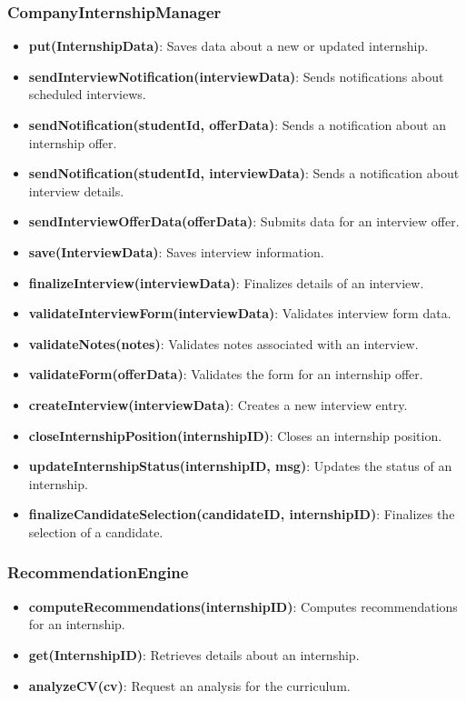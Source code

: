 \subsubsection{CompanyInternshipManager}
\begin{itemize}
    \item \textbf{put(InternshipData)}: Saves data about a new or updated internship.
    \item \textbf{sendInterviewNotification(interviewData)}: Sends notifications about scheduled interviews.
    \item \textbf{sendNotification(studentId, offerData)}: Sends a notification about an internship offer.
    \item \textbf{sendNotification(studentId, interviewData)}: Sends a notification about interview details.
    \item \textbf{sendInterviewOfferData(offerData)}: Submits data for an interview offer.
    \item \textbf{save(InterviewData)}: Saves interview information.
    \item \textbf{finalizeInterview(interviewData)}: Finalizes details of an interview.
    \item \textbf{validateInterviewForm(interviewData)}: Validates interview form data.
    \item \textbf{validateNotes(notes)}: Validates notes associated with an interview.
    \item \textbf{validateForm(offerData)}: Validates the form for an internship offer.
    \item \textbf{createInterview(interviewData)}: Creates a new interview entry.
    \item \textbf{closeInternshipPosition(internshipID)}: Closes an internship position.
    \item \textbf{updateInternshipStatus(internshipID, msg)}: Updates the status of an internship.
    \item \textbf{finalizeCandidateSelection(candidateID, internshipID)}: Finalizes the selection of a candidate.
\end{itemize}

\subsubsection{RecommendationEngine}
\begin{itemize}
    \item \textbf{computeRecommendations(internshipID)}: Computes recommendations for an internship.
    \item \textbf{get(InternshipID)}: Retrieves details about an internship.
    \item \textbf{analyzeCV(cv)}: Request an analysis for the curriculum.
\end{itemize}

